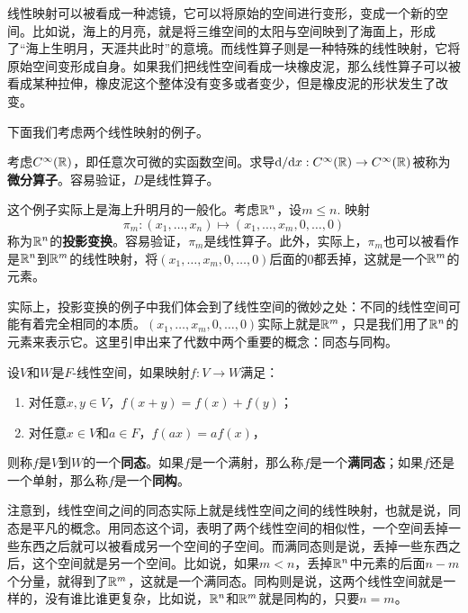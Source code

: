 线性映射可以被看成一种滤镜，它可以将原始的空间进行变形，变成一个新的空间。比如说，海上的月亮，就是将三维空间的太阳与空间映到了海面上，形成了“海上生明月，天涯共此时”的意境。而线性算子则是一种特殊的线性映射，它将原始空间变形成自身。如果我们把线性空间看成一块橡皮泥，那么线性算子可以被看成某种拉伸，橡皮泥这个整体没有变多或者变少，但是橡皮泥的形状发生了改变。

下面我们考虑两个线性映射的例子。

\begin{example}[微分算子]
考虑$C^\infty(\mathbb{R})$，即任意次可微的实函数空间。求导$\mathrm{d}/\mathrm{d} x:C^\infty(\mathbb{R})\to C^\infty(\mathbb{R})$被称为\textbf{微分算子}。容易验证，$D$是线性算子。
\end{example}

\begin{example}[投影变换]
这个例子实际上是海上升明月的一般化。考虑$\mathbb{R}^n$，设$m\leq n$. 映射
\[\pi_m:(x_1,\dots,x_n)\mapsto (x_1,\dots,x_m,0,\dots,0)\]
称为$\mathbb{R}^n$的\textbf{投影变换}。容易验证，$\pi_m$是线性算子。此外，实际上，$\pi_m$也可以被看作是$\mathbb{R}^n$到$\mathbb{R}^m$的线性映射，将$(x_1,\dots,x_m,0,\dots,0)$后面的$0$都丢掉，这就是一个$\mathbb{R}^m$的元素。
\end{example}

实际上，投影变换的例子中我们体会到了线性空间的微妙之处：不同的线性空间可能有着完全相同的本质。$(x_1,\dots,x_m,0,\dots,0)$实际上就是$\mathbb{R}^m$，只是我们用了$\mathbb{R}^n$的元素来表示它。这里引申出来了代数中两个重要的概念：同态与同构。

\begin{definition}[同态与同构]
设$V$和$W$是$F$-线性空间，如果映射$f:V\to W$满足：
\begin{enumerate}
    \item 对任意$x,y\in V$，$f(x+y)=f(x)+f(y)$；
    \item 对任意$x\in V$和$a\in F$，$f(ax)=af(x)$，
\end{enumerate}
则称$f$是$V$到$W$的一个\textbf{同态}。如果$f$是一个满射，那么称$f$是一个\textbf{满同态}；如果$f$还是一个单射，那么称$f$是一个\textbf{同构}。
\end{definition}

注意到，线性空间之间的同态实际上就是线性空间之间的线性映射，也就是说，同态是平凡的概念。用同态这个词，表明了两个线性空间的相似性，一个空间丢掉一些东西之后就可以被看成另一个空间的子空间。而满同态则是说，丢掉一些东西之后，这个空间就是另一个空间。比如说，如果$m<n$，丢掉$\mathbb{R}^n$中元素的后面$n-m$个分量，就得到了$\mathbb{R}^m$，这就是一个满同态。同构则是说，这两个线性空间就是一样的，没有谁比谁更复杂，比如说，$\mathbb{R}^n$和$\mathbb{R}^m$就是同构的，只要$n=m$。

